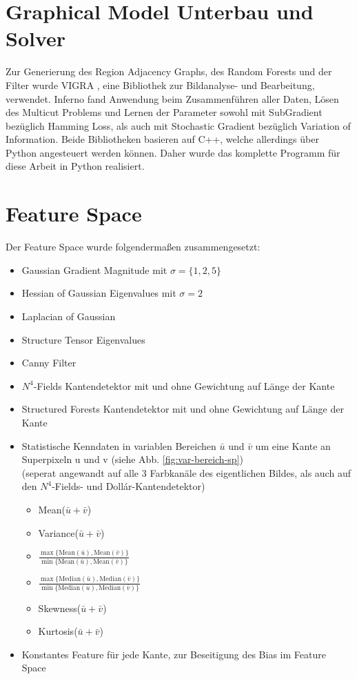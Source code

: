 \section{Graphical Model Unterbau und Solver}


Zur Generierung des Region Adjacency Graphs, des Random Forests und der Filter wurde VIGRA \cite{VIGRA}, eine Bibliothek zur Bildanalyse- und Bearbeitung, verwendet. Inferno \cite{Inferno} fand Anwendung beim Zusammenführen aller Daten, Lösen des Multicut Problems und Lernen der Parameter sowohl mit SubGradient bezüglich Hamming Loss, als auch mit Stochastic Gradient bezüglich Variation of Information. Beide Bibliotheken basieren auf C++, welche allerdings über Python angesteuert werden können. Daher wurde das komplette Programm für diese Arbeit in Python realisiert.



\section{Feature Space}\label{sec:exp_featureSpace}

Der Feature Space wurde folgendermaßen zusammengesetzt:

\begin{itemize}
	\item Gaussian Gradient Magnitude mit $\sigma=\{1, 2, 5\}$
	\item Hessian of Gaussian Eigenvalues mit $\sigma=2$
	\item Laplacian of Gaussian
	\item Structure Tensor Eigenvalues
	\item Canny Filter
	\item $N^4$-Fields Kantendetektor \cite{n4} mit und ohne Gewichtung auf Länge der Kante
	\item Structured Forests Kantendetektor \cite[Dollár et al.]{dollar} mit und ohne Gewichtung auf Länge der Kante
	\item Statistische Kenndaten in variablen Bereichen $\bar{u}$ und $\bar{v}$ um eine Kante an Superpixeln u und v (siehe Abb. \ref{fig:var-bereich-sp}) \\
	(seperat angewandt auf alle 3 Farbkanäle des eigentlichen Bildes, als auch auf den $N^4$-Fields- und Dollár-Kantendetektor)
	\begin{itemize}
		\item Mean($\bar{u} + \bar{v}$)
		\item Variance($\bar{u} + \bar{v}$)
		\item $\frac{\max{\{\text{Mean}(\bar{u}), \text{Mean}(\bar{v}) \}}}{\min{\{\text{Mean}(\bar{u}), \text{Mean}(\bar{v})}\}}$
		\item $\frac{\max{\{\text{Median}(\bar{u}), \text{Median}(\bar{v}) \}}}{\min{\{\text{Median}(\bar{u}), \text{Median}(\bar{v})}\}}$
		\item Skewness($\bar{u} + \bar{v}$)
		\item Kurtosis($\bar{u} + \bar{v}$)
	\end{itemize}
	\item Konstantes Feature für jede Kante, zur Beseitigung des Bias im Feature Space
\end{itemize}

